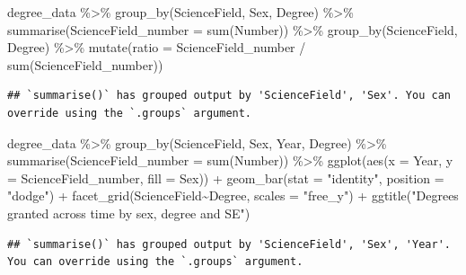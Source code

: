 \documentclass[
]{article}
\newenvironment{Shaded}{\begin{snugshade}}{\end{snugshade}}
\newcommand{\AttributeTok}[1]{\textcolor[rgb]{0.77,0.63,0.00}{#1}}
\newcommand{\FunctionTok}[1]{\textcolor[rgb]{0.00,0.00,0.00}{#1}}
\newcommand{\NormalTok}[1]{#1}
\newcommand{\SpecialCharTok}[1]{\textcolor[rgb]{0.00,0.00,0.00}{#1}}
\newcommand{\StringTok}[1]{\textcolor[rgb]{0.31,0.60,0.02}{#1}}
\begin{document}
\begin{Shaded}
\begin{Highlighting}[]
\NormalTok{degree\_data }\SpecialCharTok{\%\textgreater{}\%}
  \FunctionTok{group\_by}\NormalTok{(ScienceField, Sex, Degree) }\SpecialCharTok{\%\textgreater{}\%}
  \FunctionTok{summarise}\NormalTok{(}\AttributeTok{ScienceField\_number =} \FunctionTok{sum}\NormalTok{(Number)) }\SpecialCharTok{\%\textgreater{}\%}
  \FunctionTok{group\_by}\NormalTok{(ScienceField, Degree) }\SpecialCharTok{\%\textgreater{}\%}
  \FunctionTok{mutate}\NormalTok{(}\AttributeTok{ratio =}\NormalTok{ ScienceField\_number }\SpecialCharTok{/} \FunctionTok{sum}\NormalTok{(ScienceField\_number))}
\end{Highlighting}
\end{Shaded}

\begin{verbatim}
## `summarise()` has grouped output by 'ScienceField', 'Sex'. You can override using the `.groups` argument.
\end{verbatim}

\begin{Shaded}
\begin{Highlighting}[]
\NormalTok{degree\_data }\SpecialCharTok{\%\textgreater{}\%}
  \FunctionTok{group\_by}\NormalTok{(ScienceField, Sex, Year, Degree) }\SpecialCharTok{\%\textgreater{}\%}
  \FunctionTok{summarise}\NormalTok{(}\AttributeTok{ScienceField\_number =} \FunctionTok{sum}\NormalTok{(Number)) }\SpecialCharTok{\%\textgreater{}\%}
  \FunctionTok{ggplot}\NormalTok{(}\FunctionTok{aes}\NormalTok{(}\AttributeTok{x =}\NormalTok{ Year, }\AttributeTok{y =}\NormalTok{ ScienceField\_number, }\AttributeTok{fill =}\NormalTok{ Sex)) }\SpecialCharTok{+}
  \FunctionTok{geom\_bar}\NormalTok{(}\AttributeTok{stat =} \StringTok{"identity"}\NormalTok{, }\AttributeTok{position =} \StringTok{"dodge"}\NormalTok{) }\SpecialCharTok{+}
  \FunctionTok{facet\_grid}\NormalTok{(ScienceField}\SpecialCharTok{\textasciitilde{}}\NormalTok{Degree, }\AttributeTok{scales =} \StringTok{"free\_y"}\NormalTok{) }\SpecialCharTok{+}
  \FunctionTok{ggtitle}\NormalTok{(}\StringTok{"Degrees granted across time by sex, degree and SE"}\NormalTok{)}
\end{Highlighting}
\end{Shaded}

\begin{verbatim}
## `summarise()` has grouped output by 'ScienceField', 'Sex', 'Year'. You can override using the `.groups` argument.
\end{verbatim}
\end{document}
